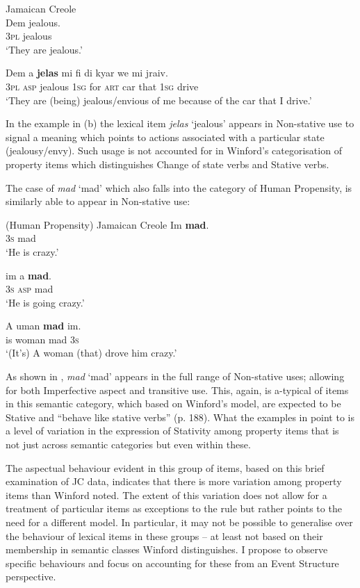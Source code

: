  
\ea%
\label{ex:3:30}
Jamaican Creole\\
\ea
\gll Dem jealous.\\
\textsc{3pl} jealous              \\
\glt `They are jealous.'

\ex
\gll Dem  a \textbf{jelas} mi fi di   kyar  we mi jraiv.\\
\textsc{3pl} \textsc{asp} jealous \textsc{1sg} for \textsc{art} car that \textsc{1sg} drive  \\
\glt `They are (being) jealous\slash envious of me because of the car that I drive.' \z \z

In the example in (b) the lexical item \textit{jelas} ‘jealous’
appears in Non-stative use to signal a meaning which points to actions
associated with a particular state (jealousy\slash envy).  Such usage is not
accounted for in Winford’s categorisation of property items which
distinguishes Change of state verbs and Stative verbs.

The case of \textit{mad} ‘mad’ which also falls into the category of
Human Propensity, is similarly able to appear in Non-stative use:

\ea%
\label{ex:3:31}
(Human Propensity) Jamaican Creole\ea
\gll Im \textbf{mad}.\\
		\textsc{3s} mad          \\
\glt `He is crazy.'

\ex
\gll  im a \textbf{mad}.\\
\textsc{3s} \textsc{asp} mad        \\
\glt `He is going crazy.'

\ex
\gll A uman \textbf{mad} im.\\
		is woman mad \textsc{3s}    \\
\glt `(It’s) A woman (that) drove him crazy.' \z \z

As shown in , \textit{mad} `mad' appears in the full range of
Non-stative uses; allowing for both Imperfective aspect and transitive
use.  This, again, is a-typical of items in this semantic category,
which based on Winford’s model, are expected to be Stative and “behave
like stative verbs” (p. 188).  What the examples in  point to
is a level of variation in the expression of Stativity among property
items that is not just across semantic categories but even within
these.

The aspectual behaviour evident in this group of items, based on this
brief examination of JC data, indicates that there is more variation
among property items than Winford noted.  The extent of this variation
does not allow for a treatment of particular items as exceptions to
the rule but rather points to the need for a different model.  In
particular, it may not be possible to generalise over the behaviour of
lexical items in these groups -- at least not based on their membership
in semantic classes Winford distinguishes.  I propose to observe
specific behaviours and focus on accounting for these from an Event
Structure perspective.


